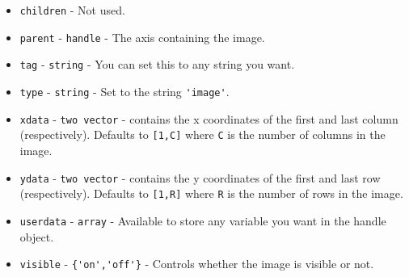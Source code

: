 \begin{itemize}
\item  \verb|children| - Not used.

\item  \verb|parent| - \verb|handle| - The axis containing the image.

\item  \verb|tag| - \verb|string| - You can set this to any string you want.

\item  \verb|type| - \verb|string| - Set to the string \verb|'image'|.

\item  \verb|xdata| - \verb|two vector| - contains the x coordinates of the
 first and last column (respectively).  Defaults to \verb|[1,C]| where
 \verb|C| is the number of columns in the image.

\item  \verb|ydata| - \verb|two vector| - contains the y coordinates of the
 first and last row (respectively).  Defaults to \verb|[1,R]| where
 \verb|R| is the number of rows in the image.

\item  \verb|userdata| - \verb|array| - Available to store any variable you
 want in the handle object.

\item  \verb|visible| - \verb|{'on','off'}| - Controls whether the image is
 visible or not.

\end{itemize}
